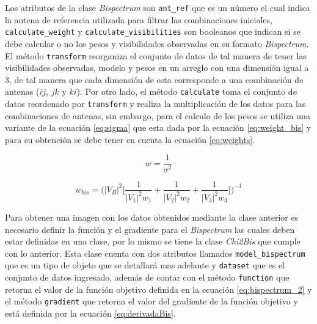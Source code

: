 Los atributos de la clase \textit{Bispectrum} son \texttt{ant\_ref} que es un número el cual indica la antena de referencia utilizada para filtrar las combinaciones iniciales, \texttt{calculate\_weight} y \texttt{calculate\_visibilities} son booleanos que indican si se debe calcular o no los pesos y visibilidades observadas en su formato \textit{Bispectrum}. El método \texttt{transform} reorganiza el conjunto de datos de tal manera de tener las visibilidades observadas, modelo y pesos en un arreglo con una dimensión igual a 3, de tal manera que cada dimensión de esta corresponde a una combinación de antenas ($ij$, $jk$ y $ki$). Por otro lado, el método \texttt{calculate} toma el conjunto de datos reordenado por \texttt{transform} y realiza la multiplicación de los datos para las combinaciones de antenas, sin embargo, para el calculo de los pesos se utiliza una variante de la ecuación \ref{eq:sigma} que esta dada por la ecuación \ref{eq:weight_bis} y para su obtención se debe tener en cuenta la ecuación \ref{eq:weights}.

\begin{equation}
    \label{eq:weights}
    w = \frac{1}{\sigma^2}
\end{equation}

\begin{equation}
    \label{eq:weight_bis}
    w_{bis} = \bigg( |V_{B}|^{2} \bigg[ \frac{1}{|V_{1}|^{2} w_{1}} + \frac{1}{|V_{2}|^{2} w_{2}} + \frac{1}{|V_{3}|^{2} w_{3}}\bigg] \bigg)^{-1}
\end{equation}

Para obtener una imagen con los datos obtenidos mediante la clase anterior es necesario definir la función y el gradiente para el \textit{Bispectrum} las cuales deben estar definidas en una clase, por lo mismo se tiene la clase \textit{Chi2Bis} que cumple con lo anterior. Esta clase cuenta con dos atributos llamados \texttt{model\_bispectrum} que es un tipo de objeto que se detallará mas adelante y \texttt{dataset} que es el conjunto de datos ingresado, además de contar con el método \texttt{function} que retorna el valor de la función objetivo definida en la ecuación \ref{eq:bispectrum_2} y el método \texttt{gradient} que retorna el valor del gradiente de la función objetivo y está definida por la ecuación \ref{eq:derivadaBis}.

